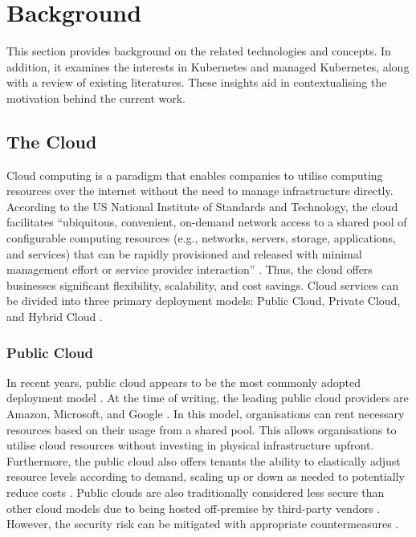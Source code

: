 \chapter{Background}\label{background}

This section provides background on the related technologies and concepts. In addition, it examines the interests in Kubernetes and managed Kubernetes, along with a review of existing literatures. These insights aid in contextualising the motivation behind the current work.


\section{The Cloud}

Cloud computing is a paradigm that enables companies to utilise computing resources over the internet without the need to manage infrastructure directly. According to the US National Institute of Standards and Technology, the cloud facilitates ``ubiquitous, convenient, on-demand network access to a shared pool of configurable computing resources (e.g., networks, servers, storage, applications, and services) that can be rapidly provisioned and released with minimal management effort or service provider interaction'' \cite{editorCloudComputingGlossary}. Thus, the cloud offers businesses significant flexibility, scalability, and cost savings. Cloud services can be divided into three primary deployment models: Public Cloud, Private Cloud, and Hybrid Cloud \cite{ramgovind2010management}.

\subsection{Public Cloud}\label{subsec:public-cloud}

In recent years, public cloud appears to be the most commonly adopted deployment model \cite{VoiceKubernetesExperts,CNCFAnnualSurvey2024, opara2016critical}. At the time of writing, the leading public cloud providers are Amazon, Microsoft, and Google \cite{2024StateCloud}. In this model, organisations can rent necessary resources based on their usage from a shared pool. This allows organisations to utilise cloud resources without investing in physical infrastructure upfront. Furthermore, the public cloud also offers tenants the ability to elastically adjust resource levels according to demand, scaling up or down as needed to potentially reduce costs \cite{suleiman2012understanding}. Public clouds are also traditionally considered less secure than other cloud models due to being hosted off-premise by third-party vendors \cite{sakr2011survey}. However, the security risk can be mitigated with appropriate countermeasures \cite{fox2009above}.


